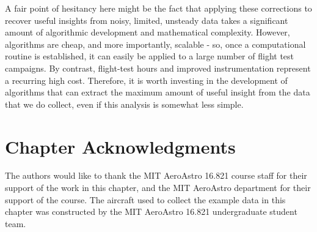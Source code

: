 A fair point of hesitancy here might be the fact that applying these corrections to recover useful insights from noisy, limited, unsteady data takes a significant amount of algorithmic development and mathematical complexity. However, algorithms are cheap, and more importantly, scalable - so, once a computational routine is established, it can easily be applied to a large number of flight test campaigns. By contrast, flight-test hours and improved instrumentation represent a recurring high cost. Therefore, it is worth investing in the development of algorithms that can extract the maximum amount of useful insight from the data that we do collect, even if this analysis is somewhat less simple.

\section*{Chapter Acknowledgments}
The authors would like to thank the MIT AeroAstro 16.821 course staff for their support of the work in this chapter, and the MIT AeroAstro department for their support of the course. The aircraft used to collect the example data in this chapter was constructed by the MIT AeroAstro 16.821 undergraduate student team.

%    
